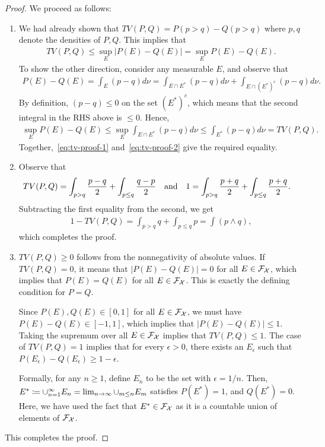 \documentclass[12pt]{article}
\begin{document}
\begin{proof} We proceed as follows: 
\begin{enumerate}
	\item We had already shown that $TV(P, Q) = P(p>q) - Q(p>q)$ where $p,q$ denote the densities of $P,Q$. This implies that 
	\begin{align}
	TV(P, Q) \leq \sup_{E} |P(E) - Q(E)| = \sup_{E} P(E) - Q(E).  \label{eq:tv-proof-1}
	\end{align}
	To show the other direction, consider any measurable $E$, and observe that 
	\begin{align}
		P(E) - Q(E) = \int_E (p-q)d\nu = \int_{E \cap E^*} (p-q) d\nu + \int_{E \cap (E^*)^c} (p-q)d\nu. 
	\end{align}
	By definition, $(p-q)\leq 0$ on the set $(E^*)^c$, which means that the second integral in the RHS above is $\leq 0$. Hence, 
	\begin{align}
	\sup_{E} P(E) - Q(E) \leq \sup_{E} \int_{E \cap E^*} (p-q) d\nu \leq \int_{E^*} (p-q) d\nu = TV(P, Q).  \label{eq:tv-proof-2}
	\end{align}
	Together,~\eqref{eq:tv-proof-1} and~\eqref{eq:tv-proof-2} give the required equality.

	\item Observe that 
	\begin{align}
		TV(P, Q) &= \int_{p>q} \frac{p-q}{2}  + \int_{p\leq q} \frac{q-p}{2} \quad \text{and} \quad
		1 = \int_{p>q} \frac{p+q}{2}  + \int_{p\leq q} \frac{p+q}{2}. 
	\end{align}
	Subtracting the first equality from the second, we get 
	\begin{align}
	1 - TV(P, Q) = \int_{p>q} q + \int_{p \leq q} p = \int (p \wedge q), 
	\end{align}
	which completes the proof. 

	
	\item $TV(P, Q) \geq 0$ follows from the nonnegativity of absolute values. If $TV(P, Q)=0$, it means that $|P(E)-Q(E)|=0$ for all $E \in {\cal F}_{{\cal X}}$, which implies that $P(E) = Q(E)$ for all $E \in {\cal F}_{{\cal X}}$. This is exactly the defining condition for $P=Q$. 
	
	Since $P(E), Q(E) \in [0,1]$ for all $E \in {\cal F}_{{\cal X}}$, we must have $P(E) - Q(E) \in [-1,1]$, which implies that $|P(E)-Q(E)|\leq 1$. Taking the supremum over all $E \in {\cal F}_{{\cal X}}$ implies that $TV(P, Q) \leq 1$. The case of $TV(P, Q)=1$ implies that for every $\epsilon>0$, there exists an $E_\epsilon$ such that $P(E_\epsilon) - Q(E_\epsilon) \geq 1- \epsilon$. 

	Formally, for any $n \geq 1$, define $E_n$ to be the set with $\epsilon=1/n$. Then, $E^* \coloneqq \cup_{n=1}^{\infty} E_n = \lim_{n \to \infty} \cup_{m \leq n} E_m$ satisfies $P(E^*) = 1$, and $Q(E^*)=0$. Here, we have used the fact that $E^* \in {\cal F}_{{\cal X}}$ as it is a countable union of elements of ${\cal F}_{{\cal X}}$. 
\end{enumerate}
This completes the proof.
\end{proof}
\end{document}
